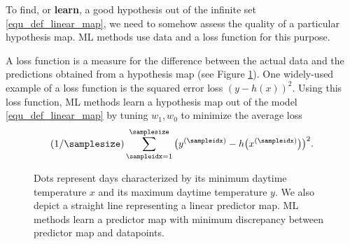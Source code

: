 \documentclass[12pt]{report}
\newcommand{\boundellipse}[3]%
{(#1) ellipse (#2 and #3)
}
\begin{document}
To find, or {\bf learn}, a good hypothesis out of the infinite 
set \eqref{equ_def_linear_map}, we need to somehow assess 
the quality of a particular hypothesis map. ML methods use 
data and a loss function for this purpose. 

A loss function is a measure for the difference between the actual 
data and the predictions obtained from a hypothesis map (see Figure \ref{fig_scatterplot_temp_FMI_linalg}). 
One widely-used example of a loss function is the squared error loss $(y-h(x))^2$. 
Using this loss function, ML methods learn a hypothesis map 
out of the model \eqref{equ_def_linear_map} by tuning $w_{1},w_{0}$ to minimize 
the average loss $$(1/\samplesize) \sum_{\sampleidx=1}^{\samplesize} \big( y^{(\sampleidx)} - h\big(x^{(\sampleidx)} \big) \big)^{2}.$$

\begin{figure}[htbp]
	\begin{center}
		\vspace*{-14mm}
	\end{center}
	\caption{Dots represent days characterized by its minimum daytime temperature $x$ 
		and its maximum daytime temperature $y$. We also depict a straight line representing 
		a linear predictor map. ML methods learn a predictor map with minimum discrepancy 
		between predictor map and datapoints. 
	}
	\label{fig_scatterplot_temp_FMI_linalg}
	\vspace*{-3mm}
\end{figure}
\end{document}
